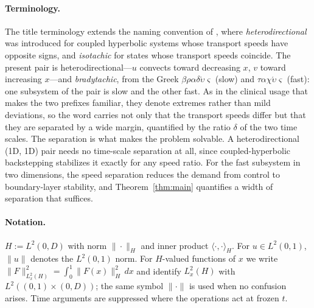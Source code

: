 \documentclass[12pt]{article}
\theoremstyle{plain}
\theoremstyle{remark}
\newcommand{\Hs}{H}
\begin{document}
\paragraph{Terminology.}
The title terminology extends the naming convention of \cite{HuDiMeglio2016}, where \emph{heterodirectional} was introduced for coupled hyperbolic systems whose transport speeds have opposite signs, and \emph{isotachic} for states whose transport speeds coincide. The present pair is heterodirectional---$u$ convects toward decreasing $x$, $v$ toward increasing $x$---and \emph{bradytachic}, from the Greek $\beta\rho\alpha\delta\acute\upsilon\varsigma$ (slow) and $\tau\alpha\chi\acute\upsilon\varsigma$ (fast): one subsystem of the pair is slow and the other fast. As in the clinical usage that makes the two prefixes familiar, they denote extremes rather than mild deviations, so the word carries not only that the transport speeds differ but that they are separated by a wide margin, quantified by the ratio $\delta$ of the two time scales. The separation is what makes the problem solvable. A heterodirectional (1D, 1D) pair needs no time-scale separation at all, since coupled-hyperbolic backstepping stabilizes it exactly for any speed ratio. For the fast subsystem in two dimensions, the speed separation reduces the demand from control to boundary-layer stability, and Theorem~\ref{thm:main} quantifies a width of separation that suffices.

\paragraph{Notation.}
$\Hs:=L^2(0,D)$ with norm $\|\cdot\|_\Hs$ and inner product $\langle\cdot,\cdot\rangle_\Hs$. For $u\in L^2(0,1)$, $\|u\|$ denotes the $L^2(0,1)$ norm. For $\Hs$-valued functions of $x$ we write $\|F\|_{L^2_x(\Hs)}^2=\int_0^1\|F(x)\|_\Hs^2\,dx$ and identify $L^2_x(\Hs)$ with $L^2((0,1)\times(0,D))$; the same symbol $\|\cdot\|$ is used when no confusion arises. Time arguments are suppressed where the operations act at frozen $t$.
\end{document}

